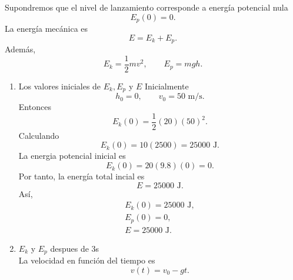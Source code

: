 \documentclass[12pt,a4paper]{article}
\begin{document}
    \begin{solucion}
        Supondremos que el nivel de lanzamiento corresponde a energía potencial nula
        \begin{equation*}
            E_{p}(0)=0.
        \end{equation*}
        La energía mecánica es
        \begin{equation*}
            E=E_{k}+E_{p}.
        \end{equation*}
        Además,
        \begin{equation*}
            E_{k}=\frac{1}{2}mv^{2},\qquad E_{p}=mgh.
        \end{equation*}
        \begin{enumerate}
            \item[(a)] Los valores iniciales de $E_{k},E_{p}$ y $E$
            Inicialmente
            \begin{equation*}
                h_{0}=0,\qquad v_{0}=50\text{ m/s}.
            \end{equation*}
            Entonces
            \begin{equation*}
                E_{k}(0)=\frac{1}{2}(20)(50)^{2}.
            \end{equation*}
            Calculando
            \begin{equation*}
                E_{k}(0)=10(2500)=25000\text{ J}.
            \end{equation*}
            La energia potencial inicial es
            \begin{equation*}
                E_{k}(0)=20(9.8)(0)=0.
            \end{equation*}
            Por tanto, la energía total incial es
            \begin{equation*}
                E=25000\text{ J}.
            \end{equation*}
            Así,
            \begin{gather*}
                E_{k}(0)=25000\text{ J},\\
                E_{p}(0)=0,\\
                E=25000\text{ J}.
            \end{gather*}
            \item[(b)] $E_{k}$ y $E_{p}$ despues de 3s\\
            La velocidad en función del tiempo es
            \begin{equation*}
                v(t)=v_{0}-gt.
            \end{equation*}

\end{enumerate}
\end{solucion}
\end{document}
